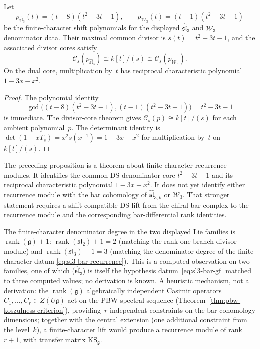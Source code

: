 \begin{proposition}
\label{prop:ds-invariant-discriminant}
Let
\[
p_{\widehat{\mathfrak{sl}}_3}(t)=(t-8)(t^2-3t-1),\qquad
p_{\mathcal{W}_3}(t)=(t-1)(t^2-3t-1)
\]
be the finite-character shift polynomials for the displayed
$\widehat{\mathfrak{sl}}_3$ and $\mathcal{W}_3$ denominator data.  Their
maximal common divisor is $s(t)=t^2-3t-1$, and the associated divisor
cores satisfy
\[
\mathcal{C}_s(p_{\widehat{\mathfrak{sl}}_3})
\cong k[t]/(s)
\cong \mathcal{C}_s(p_{\mathcal{W}_3}).
\]
On the dual core, multiplication by~$t$ has reciprocal characteristic
polynomial $1-3x-x^2$.
\end{proposition}

\begin{proof}
The polynomial identity
\[
\gcd\bigl((t-8)(t^2-3t-1),(t-1)(t^2-3t-1)\bigr)=t^2-3t-1
\]
is immediate.  The divisor-core theorem gives
$\mathcal{C}_s(p)\cong k[t]/(s)$ for each ambient polynomial~$p$.
The determinant identity is
$\det(1-xT_s)=x^2s(x^{-1})=1-3x-x^2$ for multiplication by~$t$ on
$k[t]/(s)$.
\end{proof}

\begin{remark}
The preceding proposition is a theorem about finite-character
recurrence modules. It identifies the common DS denominator core
$t^2-3t-1$ and its reciprocal characteristic polynomial
$1-3x-x^2$. It does not yet identify either recurrence module with
the bar cohomology of
$\widehat{\mathfrak{sl}}_{3,k}$ or $\mathcal W_3$. That stronger
statement requires a shift-compatible DS lift from the chiral bar
complex to the recurrence module and the corresponding
bar-differential rank identities.
\end{remark}

\begin{remark}\label{rem:rank-plus-one}
The finite-character denominator degree in the two displayed Lie
families is $\operatorname{rank}(\mathfrak{g})+1$:
$\operatorname{rank}(\mathfrak{sl}_2) + 1 = 2$
(matching the rank-one branch-divisor module) and
$\operatorname{rank}(\mathfrak{sl}_3) + 1 = 3$
(matching the denominator degree of the finite-character datum
\eqref{eq:sl3-bar-recurrence}).
This is a computed observation on two families, one of which
($\widehat{\mathfrak{sl}}_3$) is itself the hypothesis
datum~\eqref{eq:sl3-bar-gf} matched to three computed values; no
derivation is known.  A heuristic mechanism, not a derivation: the
$\operatorname{rank}(\mathfrak{g})$ algebraically independent
Casimir operators $C_1, \ldots, C_r \in Z(U\mathfrak{g})$ act
on the PBW spectral sequence
(Theorem~\ref{thm:pbw-koszulness-criterion}), providing~$r$
independent constraints on the bar cohomology dimensions; together
with the central extension (one additional constraint from the
level~$k$), a finite-character lift would produce a recurrence
module of rank $r+1$, with transfer matrix
$\mathrm{KS}_{\mathfrak{g}}$.
\end{remark}

